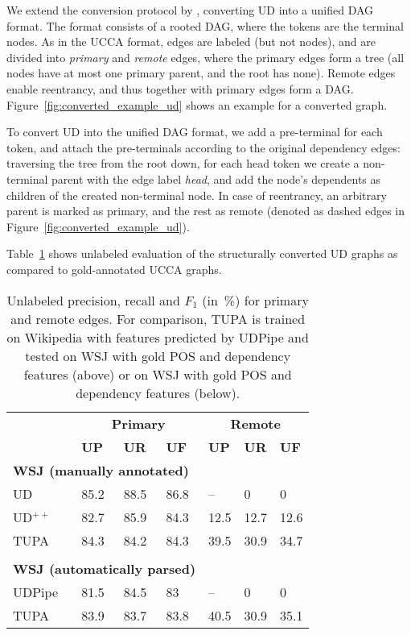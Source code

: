 \documentclass[11pt,a4paper]{article}
\begin{document}
We extend the conversion protocol by \citet{hershcovich2018multitask},
converting UD into a unified DAG format.
The format consists of a rooted DAG, where the tokens are the terminal nodes.
As in the UCCA format, edges are labeled (but not nodes),
and are divided into \textit{primary} and \textit{remote} edges,
where the primary edges form a tree (all nodes have at most one primary parent,
and the root has none).
Remote edges enable reentrancy, and thus together with primary edges
form a DAG.
Figure~\ref{fig:converted_example_ud} shows an example for a converted graph.

To convert UD into the unified DAG format,
we add a pre-terminal for each token,
and attach the pre-terminals according to the original dependency edges:
traversing the tree from the root down, for each head token we create a non-terminal
parent with the edge label {\it head},
and add the node's dependents as children of the created non-terminal node.
In case of reentrancy, an arbitrary parent is marked as primary, and the rest as remote
(denoted as dashed edges in Figure~\ref{fig:converted_example_ud}).

Table~\ref{tab:conversion_results_unlabeled} shows unlabeled evaluation of the
structurally converted UD graphs as compared to gold-annotated UCCA graphs.


\begin{table}[t]
\centering
\begin{tabular}{l|lll|lll}
& \multicolumn{3}{c|}{\footnotesize \bf Primary} & \multicolumn{3}{c}{\footnotesize \bf Remote} \\
& \footnotesize \textbf{UP} & \footnotesize \textbf{UR} & \footnotesize \textbf{UF}
& \footnotesize \textbf{UP} & \footnotesize \textbf{UR} & \footnotesize \textbf{UF} \\
\hline
\multicolumn{4}{l|}{\small \bf WSJ (manually annotated)} & \\
\footnotesize UD
& 85.2 & 88.5 & 86.8 & -- & 0 & 0 \\
\footnotesize UD$^{++}$
& 82.7 & 85.9 & 84.3 & 12.5 & 12.7 & 12.6 \\
\footnotesize TUPA
& 84.3 & 84.2 & 84.3 & 39.5 & 30.9 & 34.7 \\
\\
\multicolumn{4}{l|}{\small \bf WSJ (automatically parsed)} & \\
UDPipe & 81.5 & 84.5 & 83 & -- & 0 & 0 \\
\footnotesize TUPA
& 83.9 & 83.7 & 83.8 & 40.5 & 30.9 & 35.1
\end{tabular}
\caption{
Unlabeled precision, recall and $F_1$ (in~\%) for primary and remote edges.
For comparison, TUPA \cite{hershcovich2017a} is trained on Wikipedia with features predicted by UDPipe
and tested on WSJ with gold POS and dependency features (above)
or on WSJ with gold POS and dependency features (below).
\label{tab:conversion_results_unlabeled}}
\end{table}
\end{document}

